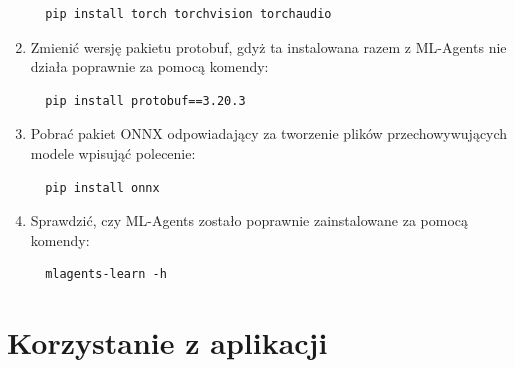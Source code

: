 \documentclass{SGGW-thesis}
\begin{document}
\begin{enumerate}
{\begin{lstlisting}
  pip install torch torchvision torchaudio
  \end{lstlisting}
  }
  \item{Zmienić wersję pakietu protobuf, gdyż ta instalowana razem z ML-Agents nie działa poprawnie za pomocą komendy:
  \begin{lstlisting}
  pip install protobuf==3.20.3
  \end{lstlisting}
  }
  \item{Pobrać pakiet ONNX odpowiadający za tworzenie plików przechowywujących modele wpisująć polecenie:
  \begin{lstlisting}
  pip install onnx
  \end{lstlisting}
  }
  \item{Sprawdzić, czy ML-Agents zostało poprawnie zainstalowane za pomocą komendy:
  \begin{lstlisting}
  mlagents-learn -h
  \end{lstlisting}
  }
\end{enumerate}

\section{Korzystanie z aplikacji}
\end{document}
